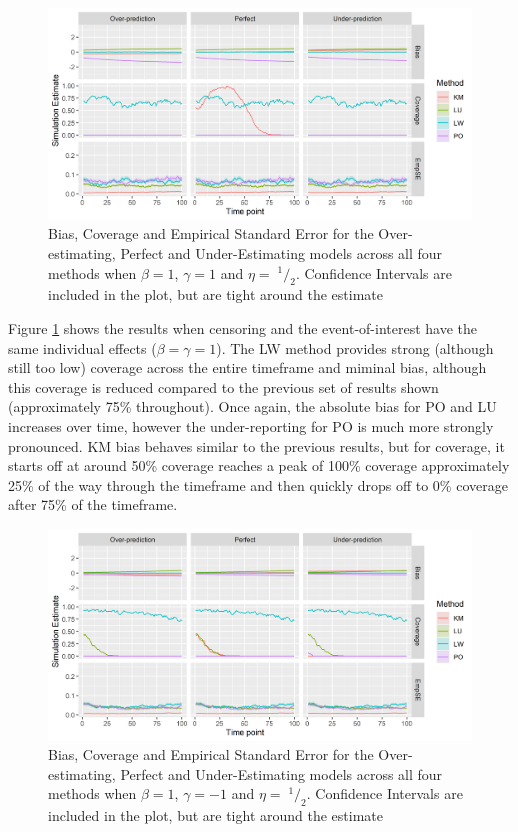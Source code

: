 \documentclass[
]{article}
\newcommand{\sfrac}[2]{\;^{#1}/_{#2}}
\begin{document}
\begin{figure}
\centering
\includegraphics{figure/IPCW_Logistic/MainPlot_b(1)_g(1)_e(0.5).png}
\caption{\label{fig:MainPlotg1}Bias, Coverage and Empirical Standard Error for the Over-estimating, Perfect and Under-Estimating models across all four methods when \(\beta=1\), \(\gamma=1\) and \(\eta=\sfrac{1}{2}\). Confidence Intervals are included in the plot, but are tight around the estimate}
\end{figure}
Figure \ref{fig:MainPlotg1} shows the results when censoring and the event-of-interest have the same individual effects (\(\beta=\gamma=1\)). The LW method provides strong (although still too low) coverage across the entire timeframe and miminal bias, although this coverage is reduced compared to the previous set of results shown (approximately 75\% throughout). Once again, the absolute bias for PO and LU increases over time, however the under-reporting for PO is much more strongly pronounced. KM bias behaves similar to the previous results, but for coverage, it starts off at around 50\% coverage reaches a peak of 100\% coverage approximately 25\% of the way through the timeframe and then quickly drops off to 0\% coverage after 75\% of the timeframe.
\begin{figure}
\centering
\includegraphics{figure/IPCW_Logistic/MainPlot_b(1)_g(-1)_e(0.5).png}
\caption{\label{fig:MainPlotg2}Bias, Coverage and Empirical Standard Error for the Over-estimating, Perfect and Under-Estimating models across all four methods when \(\beta=1\), \(\gamma=-1\) and \(\eta=\sfrac{1}{2}\). Confidence Intervals are included in the plot, but are tight around the estimate}
\end{figure}
\end{document}
